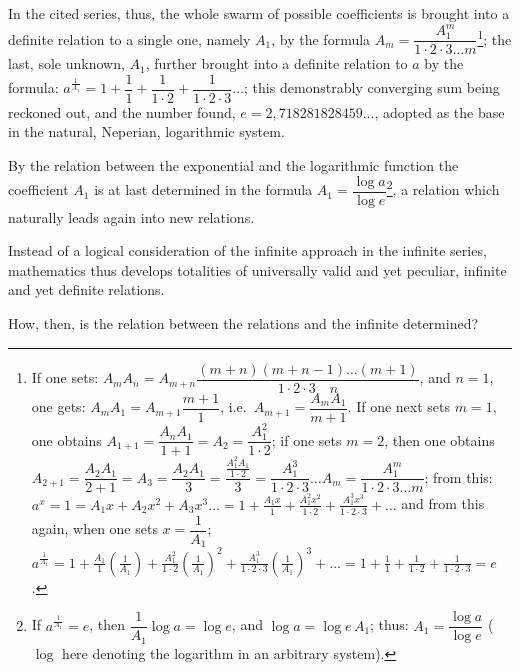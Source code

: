 \documentclass[12pt]{book}
\begin{document}
In the cited series, thus, the whole swarm of possible coefficients is brought into
a definite relation to a single one, namely $A_1$, by the formula
$A_m = \dfrac{A_1^{m}}{1\cdot 2\cdot 3\dots m}$\footnote{If one sets:
$A_m A_n = A_{m+n}\dfrac{(m+n)(m+n-1)\dots(m+1)}{1\cdot 2\cdot 3\quad n}$, and
$n = 1$, one gets: $A_m A_1 = A_{m+1}\dfrac{m+1}{1}$, i.e.\
$A_{m+1} = \dfrac{A_m A_1}{m+1}$. If one next sets $m = 1$, one obtains
$A_{1+1} = \dfrac{A_n A_1}{1+1} = A_2 = \dfrac{A_1^{2}}{1\cdot 2}$;
if one sets $m = 2$, then one obtains $A_{2+1} = \dfrac{A_2 A_1}{2+1} = A_3 =
\dfrac{A_2 A_1}{3} = \dfrac{\frac{A_1^{2}A_1}{1\cdot 2}}{3} =
\dfrac{A_1^{3}}{1\cdot 2\cdot 3}\dots A_m = \dfrac{A_1^{m}}{1\cdot 2\cdot 3\dots
m}$; from this:
$a^{x} = 1 = A_1 x + A_2 x^{2} + A_3 x^{3}\dots = 1 +
\frac{A_1 x}{1} + \frac{A_1^{2}x^{2}}{1\cdot 2} +
\frac{A_1^{3}x^{3}}{1\cdot 2\cdot 3} + \dots$
and from this again, when one sets $x = \dfrac{1}{A_1}$;
$a^{\frac{1}{A_1}} = 1 + \frac{A_1}{1}\left(\frac{1}{A_1}\right) +
\frac{A_1^{2}}{1\cdot 2}\left(\frac{1}{A_1}\right)^{2} +
\frac{A_1^{3}}{1\cdot 2\cdot 3}\left(\frac{1}{A_1}\right)^{3} + \dots = 1 +
\frac{1}{1} + \frac{1}{1\cdot 2} + \frac{1}{1\cdot 2\cdot 3} = e$.}; the last,
sole unknown, $A_1$, further brought into a definite relation to $a$ by the
formula: $a^{\frac{1}{A_1}} = 1 + \dfrac{1}{1} + \dfrac{1}{1\cdot 2} +
\dfrac{1}{1\cdot 2\cdot 3}\dots$; this demonstrably converging sum being reckoned
out, and the number found, $e = 2{,}718281828459\dots$, adopted as the base in the
natural, Neperian, logarithmic system.

By the relation between the exponential and the logarithmic function the
coefficient $A_1$ is at last determined in
the formula $A_1 = \dfrac{\log a}{\log e}$\footnote{If $a^{\frac{1}{A_1}} = e$, then
$\dfrac{1}{A_1}\log a = \log e$, and $\log a = \log e\, A_1$; thus:
$A_1 = \dfrac{\log a}{\log e}$ ($\log$ here denoting the logarithm in an arbitrary
system).}, a relation which naturally leads again into new relations.

Instead of a logical consideration of the infinite approach in the infinite series,
mathematics thus develops totalities of universally valid and yet peculiar,
infinite and yet definite relations.

How, then, is the relation between the relations and the infinite determined?
\end{document}
